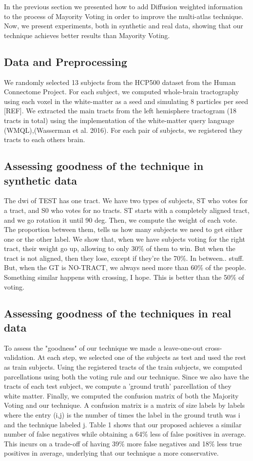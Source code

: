 In the previous section we presented how to add Diffusion weighted information
to the process of Mayority Voting in order to improve the multi-atlas technique.
Now, we present experiments, both in synthetic and real data, showing that
our technique achieves better results than Mayority Voting.

\subsection{Data and Preprocessing}
We randomly selected 13 subjects from the HCP500 dataset from the Human
Connectome Project. For each subject, we computed whole-brain tractography
using each voxel in the white-matter as a seed and simulating 8 particles per
seed [REF]. We extracted the main tracts from the left hemisphere tractogram
(18 tracts in total) using the implementation of the white-matter query
language (WMQL),(Wasserman et al. 2016). For each pair of subjects, we
registered they tracts to each others brain.

\subsection{Assessing goodness of the technique in synthetic data}
The dwi of TEST has one tract. We have two types of subjects, ST who votes for
a tract, and S0 who votes for no tracts. ST starts with a completely aligned
tract, and we go rotation it until 90 deg. Then, we compute the weight of
each vote. The proportion between them, tells us how many subjects we need to
get either one or the other label. We show that, when we have subjects voting
for the right tract, their weight go up, allowing to only 30\% of them to win.
But when the tract is not aligned, then they lose, except if they're the 70\%.
In between.. stuff.
But, when the GT is NO-TRACT, we always need more than 60\% of the people.
Something similar happens with crossing, I hope.
This is better than the 50\% of voting.

\subsection{Assessing goodness of the techniques in real data}
To assess the "goodness" of our technique we made a leave-one-out
cross-validation. At each step, we selected one of the subjects as test and 
used the rest as train subjects. Using the registered tracts of the train
subjects, we computed parcellations using both the voting rule and our technique.
Since we also have the tracts of each test subject, we compute a 'ground truth'
parcellation of they white matter. Finally, we computed the confusion matrix of
both the Majority Voting and our technique. A confusion matrix is a matrix of 
size labels by labels where the entry (i,j) is the number of times the label in
the ground truth was i and the technique labeled j. Table 1 shows that our
proposed achieves a similar number of false negatives while obtaining a 64\%
less of false positives in average. This incurs on a trade-off of having 39\%
more false negatives and 18\% less true positives in average, underlying that
our technique a more conservative.\\


